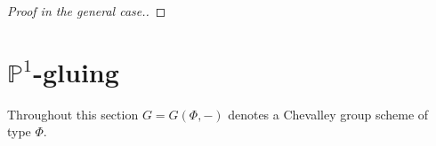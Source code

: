\documentclass[oneside,12pt]{amsart}
\numberwithin{equation}{section}
\numberwithin{lem}{section}
\theoremstyle{definition}
\theoremstyle{remark}
\newcommand{\id}{\mathrm{id}}
\newcommand{\Stb}{\mathrm{St}}
\newcommand{\Pro}{\mathbb{P}}
\newcommand{\rA}{\mathsf{A}}
\begin{document}
\begin{proof}[Proof in the general case.]

 
 
 
\end{proof}

\section{\texorpdfstring{$\Pro^1$}{P\textonesuperior}-gluing}
Throughout this section $G=G(\Phi, -)$ denotes a Chevalley group scheme of type $\Phi$.
\end{document}
